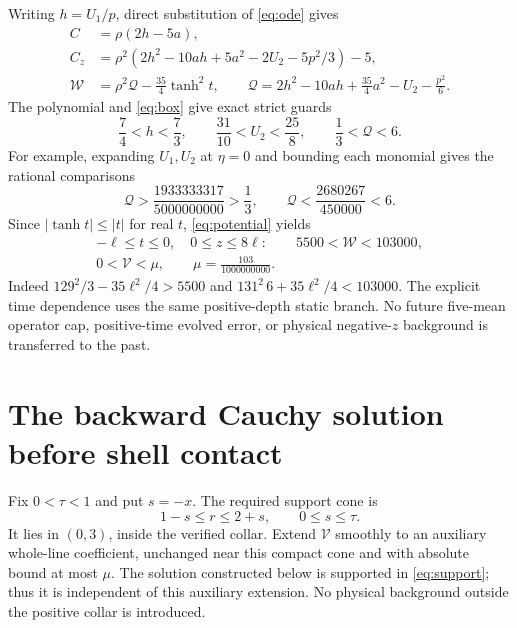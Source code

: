 \documentclass[11pt]{article}
\begin{document}
Writing $h=U_1/p$, direct substitution of \eqref{eq:ode} gives
\begin{equation}
\begin{aligned}
 C&=\rho(2h-5a),\\
 C_z&=\rho^2(2h^2-10ah+5a^2-2U_2-5p^2/3)-5,\\
 \mathcal W&=\rho^2\mathcal Q-\frac{35}{4}\tanh^2t,\qquad
 \mathcal Q=2h^2-10ah+\frac{35}{4}a^2-U_2-\frac{p^2}{6}.
\end{aligned}
\label{eq:potential}
\end{equation}
The polynomial and \eqref{eq:box} give exact strict guards
\begin{equation}
 \frac74<h<\frac73,\qquad \frac{31}{10}<U_2<\frac{25}{8},
 \qquad \frac13<\mathcal Q<6.
 \label{eq:scalarcaps}
\end{equation}
For example, expanding $U_1,U_2$ at $\eta=0$ and bounding each monomial
gives the rational comparisons
\[
 \mathcal Q>\frac{1933333317}{5000000000}>\frac13,\qquad
 \mathcal Q<\frac{2680267}{450000}<6.
\]
Since $|\tanh t|\le|t|$ for real $t$, \eqref{eq:potential} yields
\begin{equation}
 \begin{gathered}
 -\ell\le t\le0,\quad0\le z\le8\ell:
 \qquad5500<\mathcal W<103000,\\
 0<\mathcal V<\mu,\qquad \mu=\frac{103}{1000000000}.
 \end{gathered}
\label{eq:pastcap}
\end{equation}
Indeed $129^2/3-35\ell^2/4>5500$ and
$131^2\,6+35\ell^2/4<103000$.
The explicit time dependence uses the same positive-depth static branch.
No future five-mean operator cap, positive-time evolved error, or
physical negative-$z$ background is transferred to the past.

\section{The backward Cauchy solution before shell contact}
\label{sec:cauchy}
Fix $0<\tau<1$ and put $s=-x$.
The required support cone is
\begin{equation}
 1-s\le r\le2+s,\qquad0\le s\le\tau .
 \label{eq:support}
\end{equation}
It lies in $(0,3)$, inside the verified collar. Extend $\mathcal V$
smoothly to an auxiliary whole-line coefficient, unchanged near this
compact cone and with absolute bound at most $\mu$.
The solution constructed below is supported in \eqref{eq:support};
thus it is independent of this auxiliary extension. No physical
background outside the positive collar is introduced.
\end{document}
